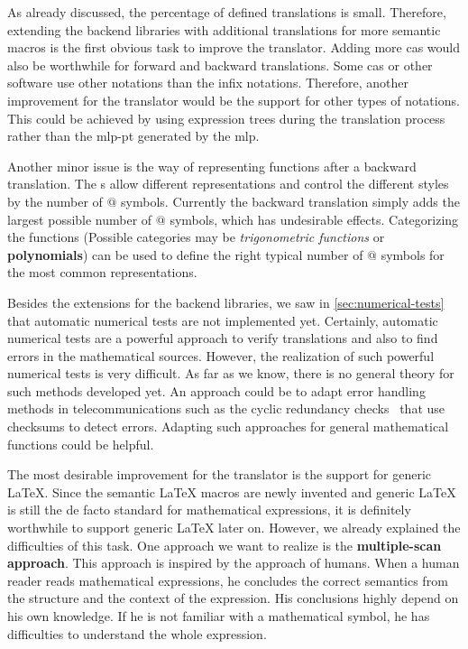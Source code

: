 As already discussed, the percentage of defined translations is small. Therefore, extending the backend libraries with additional translations for more semantic macros is the first obvious task to improve the translator. Adding more \gls{cas} would also be worthwhile for forward and backward translations. Some \gls{cas} or other software use other notations than the infix notations. Therefore, another improvement for the translator would be the support for other types of notations. This could be achieved by using expression trees during the translation process rather than the \gls{mlp-pt} generated by the \gls{mlp}.

Another minor issue is the way of representing functions after a backward translation. The \Macro s allow different representations and control the different styles by the number of $@$ symbols. Currently the backward translation simply adds the largest possible number of $@$ symbols, which has undesirable effects. Categorizing the functions (Possible categories may be \textit{trigonometric functions} or \textbf{polynomials}) can be used to define the right typical number of $@$ symbols for the most common representations.

Besides the extensions for the backend libraries, we saw in \cref{sec:numerical-tests} that automatic numerical tests are not implemented yet. Certainly, automatic numerical tests are a powerful approach to verify translations and also to find errors in the mathematical sources. However, the realization of such powerful numerical tests is very difficult. As far as we know, there is no general theory for such methods developed yet. An approach could be to adapt error handling methods in telecommunications such as the cyclic redundancy checks~\cite{CRC} that use checksums to detect errors. Adapting such approaches for general mathematical functions could be helpful.

The most desirable improvement for the translator is the support for generic \LaTeX. Since the semantic \LaTeX{} macros are newly invented and generic \LaTeX{} is still the de facto standard for mathematical expressions, it is definitely worthwhile to support generic \LaTeX{} later on. However, we already explained the difficulties of this task. One approach we want to realize is the \textbf{multiple-scan approach}. This approach is inspired by the approach of humans. When a human reader reads mathematical expressions, he concludes the correct semantics from the structure and the context of the expression. His conclusions highly depend on his own knowledge. If he is not familiar with a mathematical symbol, he has difficulties to understand the whole expression.

